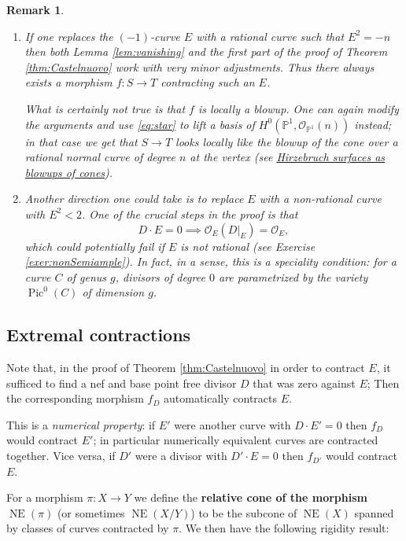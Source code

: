\documentclass[a4paper,11pt]{amsart}
\newtheorem{remark}[theorem]{Remark}
\def\NE{\operatorname{NE}}
\def\Pic{\operatorname{Pic}}
\newcommand{\OO}{\mathcal{O}}
\newcommand{\PP}{\mathbb{P}}
\begin{document}
\begin{remark}\label{rem:contrOf-nCurve}\leavevmode
	\begin{enumerate}
		\item If one replaces the $(-1)$-curve $E$ with a rational curve such that $E^2 = -n$ then both Lemma \ref{lem:vanishing} and the first part of the proof of Theorem \ref{thm:Castelnuovo} work with very minor adjustments.
		Thus there always exists a morphism $f\colon S \to T$ contracting such an $E$.
		
		What is certainly not true is that $f$ is locally a blowup.
		One can again modify the arguments and use \eqref{eq:star} to lift a basis of $H^0(\PP^1,\OO_{\PP^1}(n))$ instead;
		in that case we get that $S \to T$ looks locally like the blowup of the cone over a rational normal curve of degree $n$ at the vertex (see \hyperref[sec:FFnAsBlowupsOfCone]{Hirzebruch surfaces as blowups of cones}).
		\item Another direction one could take is to replace $E$ with a non-rational curve with $E^2 < 2$.
		One of the crucial steps in the proof is that
		\[
		D\cdot E = 0 \implies \OO_E(D|_E) = \OO_E,
		\]
		which could potentially fail if $E$ is not rational (see Exercise \ref{exer:nonSemiample}).
		In fact, in a sense, this is a speciality condition: for a curve $C$ of genus $g$, divisors of degree $0$ are parametrized by the variety $\Pic^0(C)$ of dimension $g$.
	\end{enumerate}
\end{remark}

\subsection{Extremal contractions}

Note that, in the proof of Theorem \ref{thm:Castelnuovo} in order to contract $E$, it sufficed to find a nef and base point free divisor $D$ that was zero against $E$;
Then the corresponding morphism $f_D$ automatically contracts $E$.

This is a \emph{ numerical property}:
if $E'$ were another curve with $D\cdot E' = 0$ then $f_D$ would contract $E'$;
in particular numerically equivalent curves are contracted together.
Vice versa, if $D'$ were a divisor with $D'\cdot E = 0$ then $f_{D'}$ would contract $E$.

For a morphism $\pi \colon X \to Y$ we define the \textbf{relative cone of the morphism $\NE(\pi)$} (or sometimes $\NE(X/Y)$) to be the subcone of $\NE(X)$ spanned by classes of curves contracted by $\pi$.
We then have the following rigidity result:
\end{document}
